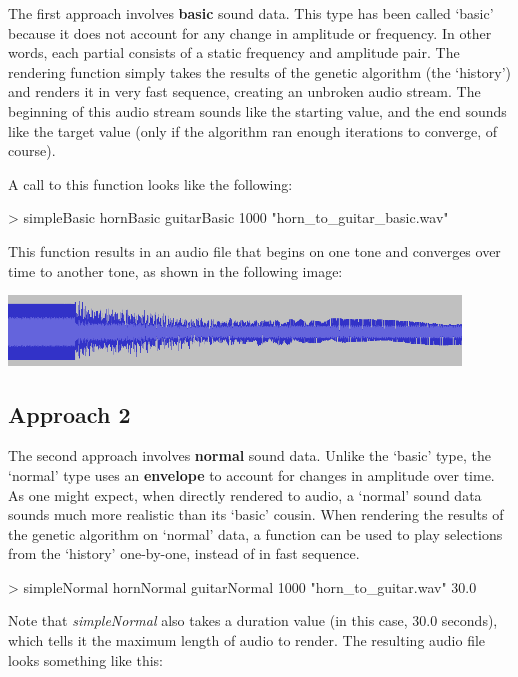 \documentclass[11pt]{article}
\begin{document}
The first approach involves {\bf basic} sound data. This type has been called `basic' because it does not account for any change in amplitude or frequency. In other words, each partial consists of a static frequency and amplitude pair. The rendering function simply takes the results of the genetic algorithm (the `history') and renders it in very fast sequence, creating an unbroken audio stream. The beginning of this audio stream sounds like the starting value, and the end sounds like the target value (only if the algorithm ran enough iterations to converge, of course).

A call to this function looks like the following:

\begin{code}
> simpleBasic hornBasic guitarBasic 1000 "horn_to_guitar_basic.wav"
\end{code}

This function results in an audio file that begins on one tone and converges over time to another tone, as shown in the following image:

\includegraphics[width=120mm]{basic_wav.png}

\subsection{Approach 2}

The second approach involves {\bf normal} sound data. Unlike the `basic' type, the `normal' type uses an {\bf envelope} to account for changes in amplitude over time. As one might expect, when directly rendered to audio, a `normal' sound data sounds much more realistic than its `basic' cousin. When rendering the results of the genetic algorithm on `normal' data, a function can be used to play selections from the `history' one-by-one, instead of in fast sequence.

\begin{code}
> simpleNormal hornNormal guitarNormal 1000 "horn_to_guitar.wav" 30.0 
\end{code}

Note that \emph{simpleNormal} also takes a duration value (in this case, 30.0 seconds), which tells it the maximum length of audio to render.
The resulting audio file looks something like this:
\end{document}
